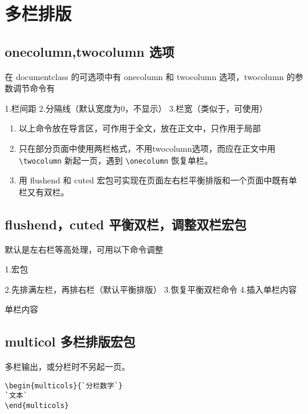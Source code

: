 \twocolumn

\section{多栏排版}
\subsection{onecolumn,twocolumn 选项}

在  documentclass 的可选项中有 onecolumn 和 twocolumn 选项，twocolumn 的参数调节命令有
\begin{cmd}[label= twocolumn 参数命令]
1.栏间距
\setlength{\columnsep}{宽度}
2.分隔线（默认宽度为0，不显示）
\setlength{columnseprule}{宽度}
3.栏宽（类似于\textwidth，可使用）
\columnwidth
\end{cmd}

\begin{enumerate}
  \item 以上命令放在导言区，可作用于全文，放在正文中，只作用于局部
  \item 只在部分页面中使用两栏格式，不用twocolumn选项，而应在正文中用\\ \verb|\twocolumn| 新起一页，遇到 \verb|\onecolumn| 恢复单栏。
  \begin{cmd}
    \twocolumn[通栏文本]
    \onecolumn
  \end{cmd}
  \item 用 flushend 和 cuted 宏包可实现在页面左右栏平衡排版和一个页面中既有单栏又有双栏。
\end{enumerate}

\subsection{flushend，cuted 平衡双栏，调整双栏宏包}
默认是左右栏等高处理，可用以下命令调整
\begin{cmd}
1.宏包
\usepackage{flushend,cuted}
2.先排满左栏，再排右栏（默认平衡排版）
\raggedend
3.恢复平衡双栏命令
\flushend
4.插入单栏内容
\begin{strip}
  单栏内容
\end{strip}
\end{cmd}
\onecolumn
\subsection{multicol 多栏排版宏包}
多栏输出，或分栏时不另起一页。
\begin{lstlisting}
\begin{multicols}{`分栏数字`}
`文本`
\end{multicols}
\end{lstlisting}

